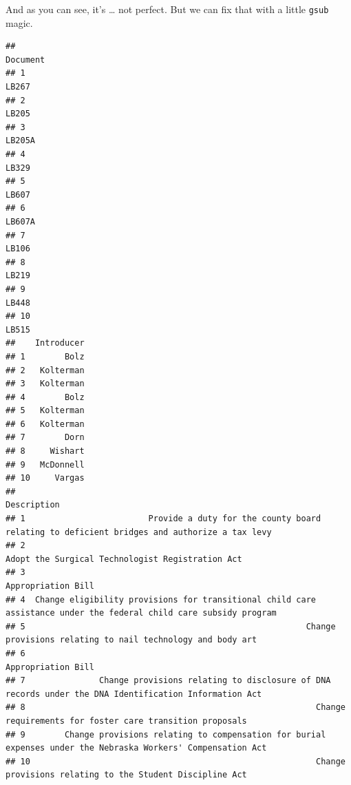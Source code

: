 \documentclass[]{book}
\newenvironment{Shaded}{\begin{snugshade}}{\end{snugshade}}
\newcommand{\CharTok}[1]{\textcolor[rgb]{0.31,0.60,0.02}{#1}}
\newcommand{\DataTypeTok}[1]{\textcolor[rgb]{0.13,0.29,0.53}{#1}}
\newcommand{\KeywordTok}[1]{\textcolor[rgb]{0.13,0.29,0.53}{\textbf{#1}}}
\newcommand{\NormalTok}[1]{#1}
\newcommand{\OperatorTok}[1]{\textcolor[rgb]{0.81,0.36,0.00}{\textbf{#1}}}
\newcommand{\StringTok}[1]{\textcolor[rgb]{0.31,0.60,0.02}{#1}}
\begin{document}
And as you can see, it's \ldots{} not perfect. But we can fix that with a little \texttt{gsub} magic.

\begin{Shaded}
\end{Shaded}

\begin{verbatim}
##                                                                 Document
## 1                                                                  LB267
## 2                                                                  LB205
## 3                                                                 LB205A
## 4                                                                  LB329
## 5                                                                  LB607
## 6                                                                 LB607A
## 7                                                                  LB106
## 8                                                                  LB219
## 9                                                                  LB448
## 10                                                                 LB515
##    Introducer
## 1        Bolz
## 2   Kolterman
## 3   Kolterman
## 4        Bolz
## 5   Kolterman
## 6   Kolterman
## 7        Dorn
## 8     Wishart
## 9   McDonnell
## 10     Vargas
##                                                                                                          Description
## 1                         Provide a duty for the county board relating to deficient bridges and authorize a tax levy
## 2                                                                   Adopt the Surgical Technologist Registration Act
## 3                                                                                                 Appropriation Bill
## 4  Change eligibility provisions for transitional child care assistance under the federal child care subsidy program
## 5                                                         Change provisions relating to nail technology and body art
## 6                                                                                                 Appropriation Bill
## 7               Change provisions relating to disclosure of DNA records under the DNA Identification Information Act
## 8                                                           Change requirements for foster care transition proposals
## 9        Change provisions relating to compensation for burial expenses under the Nebraska Workers' Compensation Act
## 10                                                          Change provisions relating to the Student Discipline Act
\end{verbatim}
\end{document}
